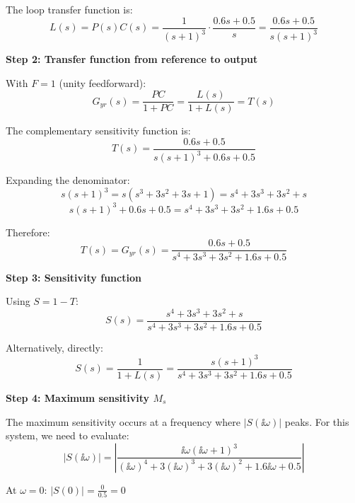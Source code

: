 \documentclass[11pt,a4paper]{article}
\begin{document}
The loop transfer function is:
\begin{equation}
	L(s) = P(s)C(s) = \frac{1}{(s+1)^3} \cdot \frac{0.6s + 0.5}{s} = \frac{0.6s + 0.5}{s(s+1)^3}
\end{equation}

\textbf{Step 2: Transfer function from reference to output}

With $F = 1$ (unity feedforward):
\begin{equation}
	G_{yr}(s) = \frac{PC}{1+PC} = \frac{L(s)}{1+L(s)} = T(s)
\end{equation}

The complementary sensitivity function is:
\begin{equation}
	T(s) = \frac{0.6s + 0.5}{s(s+1)^3 + 0.6s + 0.5}
\end{equation}

Expanding the denominator:
\begin{equation}
	s(s+1)^3 = s(s^3 + 3s^2 + 3s + 1) = s^4 + 3s^3 + 3s^2 + s
\end{equation}
\begin{equation}
	s(s+1)^3 + 0.6s + 0.5 = s^4 + 3s^3 + 3s^2 + 1.6s + 0.5
\end{equation}

Therefore:
\begin{equation}
	T(s) = G_{yr}(s) = \frac{0.6s + 0.5}{s^4 + 3s^3 + 3s^2 + 1.6s + 0.5}
\end{equation}

\textbf{Step 3: Sensitivity function}

Using $S = 1 - T$:
\begin{equation}
	S(s) = \frac{s^4 + 3s^3 + 3s^2 + s}{s^4 + 3s^3 + 3s^2 + 1.6s + 0.5}
\end{equation}

Alternatively, directly:
\begin{equation}
	S(s) = \frac{1}{1+L(s)} = \frac{s(s+1)^3}{s^4 + 3s^3 + 3s^2 + 1.6s + 0.5}
\end{equation}

\textbf{Step 4: Maximum sensitivity $M_s$}

The maximum sensitivity occurs at a frequency where $|S(\ii\omega)|$ peaks. For this system, we need to evaluate:
\begin{equation}
	|S(\ii\omega)| = \left|\frac{\ii\omega(\ii\omega + 1)^3}{(\ii\omega)^4 + 3(\ii\omega)^3 + 3(\ii\omega)^2 + 1.6\ii\omega + 0.5}\right|
\end{equation}

At $\omega = 0$: $|S(0)| = \frac{0}{0.5} = 0$
\end{document}

